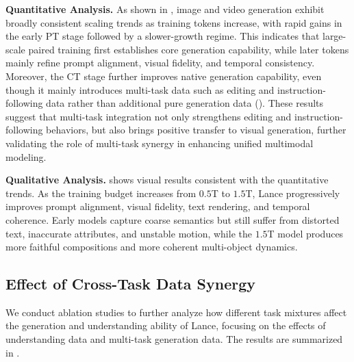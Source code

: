 \textbf{Quantitative Analysis.}
As shown in , image and video generation exhibit broadly consistent scaling trends as training tokens increase, with rapid gains in the early PT stage followed by a slower-growth regime. This indicates that large-scale paired training first establishes core generation capability, while later tokens mainly refine prompt alignment, visual fidelity, and temporal consistency.
Moreover, the CT stage further improves native generation capability, even though it mainly introduces multi-task data such as editing and instruction-following data rather than additional pure generation data (). These results suggest that multi-task integration not only strengthens editing and instruction-following behaviors, but also brings positive transfer to visual generation, further validating the role of multi-task synergy in enhancing unified multimodal modeling.


\textbf{Qualitative Analysis.}
 shows visual results consistent with the quantitative trends. As the training budget increases from $0.5$T to $1.5$T, Lance progressively improves prompt alignment, visual fidelity, text rendering, and temporal coherence. Early models capture coarse semantics but still suffer from distorted text, inaccurate attributes, and unstable motion, while the $1.5$T model produces more faithful compositions and more coherent multi-object dynamics. 




\subsection{Effect of Cross-Task Data Synergy}

We conduct ablation studies to further analyze how different task mixtures affect the generation and understanding ability of Lance, focusing on the effects of understanding data and multi-task generation data. 
The results are summarized in .


